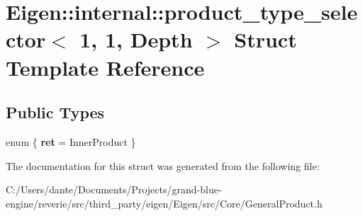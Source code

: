 \hypertarget{struct_eigen_1_1internal_1_1product__type__selector_3_011_00_011_00_01_depth_01_4}{}\section{Eigen\+::internal\+::product\+\_\+type\+\_\+selector$<$ 1, 1, Depth $>$ Struct Template Reference}
\label{struct_eigen_1_1internal_1_1product__type__selector_3_011_00_011_00_01_depth_01_4}
\subsection*{Public Types}
\begin{DoxyCompactItemize}
\item 
\mbox{\label{struct_eigen_1_1internal_1_1product__type__selector_3_011_00_011_00_01_depth_01_4_a29d609e009f2e15ed4aceb271b08e4bf}} 
enum \{ {\bfseries ret} = Inner\+Product
 \}
\end{DoxyCompactItemize}


The documentation for this struct was generated from the following file\+:\begin{DoxyCompactItemize}
\item 
C\+:/\+Users/dante/\+Documents/\+Projects/grand-\/blue-\/engine/reverie/src/third\+\_\+party/eigen/\+Eigen/src/\+Core/General\+Product.\+h\end{DoxyCompactItemize}
